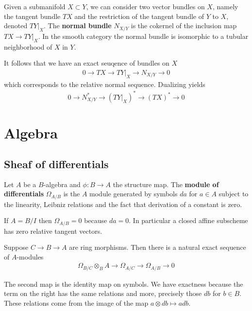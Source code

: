 \documentclass[12pt]{article}
\begin{document}
\begin{definition}
    Given a submanifold $X\subset Y$, we can consider two vector bundles on $X$, namely the tangent bundle $TX$ and the 
    restriction of the tangent bundle of $Y$ to $X$, denoted $TY|_X$. The \textbf{normal bundle} $N_{X/Y}$ is the cokernel
    of the inclusion map $TX\to TY|_X$. In the smooth category the normal bundle is isomorphic
    to a tubular neighborhood of $X$ in $Y$.
\end{definition}

It follows that we have an exact seuqence of bundles on $X$ \begin{align*}
    0\to TX\to TY|_X\to N_{X/Y}\to 0
\end{align*} which corresponds to the relative normal sequence.
Dualizing yields \begin{align*}
    0\to N^*_{X/Y}\to (TY|_X)^*\to (TX)^*\to 0
\end{align*}

\section{Algebra}
\subsection{Sheaf of differentials}
\begin{definition}
    Let $A$ be a $B$-algebra and $\phi:B\to A$ the structure map. The \textbf{module of differentials} $\Omega_{A/B}$ is the
    $A$ module generated by symbols $da$ for $a\in A$ subject to the linearity, Leibniz relations and the fact that derivation of a 
    constant is zero.
\end{definition}

\begin{example}
    If $A = B/I$ then $\Omega_{A/B} = 0$ because $da = 0$. In particular a closed affine subscheme has zero relative tangent vectors.
\end{example}

\begin{theorem}
     Suppose $C\to B\to A$ are ring morphisms.
    Then there is a natural exact sequence of $A$-modules \begin{align*}
        \Omega_{B/C}\otimes_B A\to \Omega_{A/C}\to \Omega_{A/B}\to 0
    \end{align*}
\end{theorem}
The second map is the identity map on symbols. We have exactness because the term on the right 
has the same relations and more, precisely those $db$ for $b\in B$. These relations come from 
the image of the map $a \otimes db \mapsto adb$.
\end{document}
